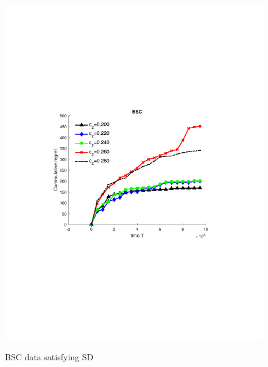 \begin{figure}[!bt]
	\begin{minipage}{4cm}
		\centering
		\vspace{.7cm}
		\includegraphics[scale=0.3]{../Simulations/Figures/BSC_SD}
		\label{fig:BSC_SD}
		\vspace{-.2cm}
		\caption{BSC data satisfying SD}
	\end{minipage}
	\begin{minipage}{4cm}
		\centering

\end{minipage}
\end{figure}
